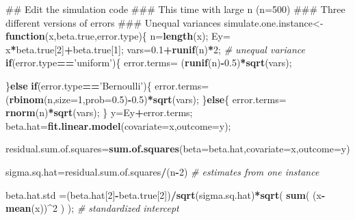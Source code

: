 \documentclass[12pt,]{book}
\newenvironment{Shaded}{\begin{snugshade}}{\end{snugshade}}
\newcommand{\KeywordTok}[1]{\textcolor[rgb]{0.13,0.29,0.53}{\textbf{#1}}}
\newcommand{\DataTypeTok}[1]{\textcolor[rgb]{0.13,0.29,0.53}{#1}}
\newcommand{\DecValTok}[1]{\textcolor[rgb]{0.00,0.00,0.81}{#1}}
\newcommand{\FloatTok}[1]{\textcolor[rgb]{0.00,0.00,0.81}{#1}}
\newcommand{\StringTok}[1]{\textcolor[rgb]{0.31,0.60,0.02}{#1}}
\newcommand{\CommentTok}[1]{\textcolor[rgb]{0.56,0.35,0.01}{\textit{#1}}}
\newcommand{\ControlFlowTok}[1]{\textcolor[rgb]{0.13,0.29,0.53}{\textbf{#1}}}
\newcommand{\OperatorTok}[1]{\textcolor[rgb]{0.81,0.36,0.00}{\textbf{#1}}}
\newcommand{\NormalTok}[1]{#1}
\begin{document}
\begin{Shaded}
\begin{Highlighting}[]
\NormalTok{## Edit the simulation code }
\NormalTok{### This time with large n (n=500)}
\NormalTok{### Three different versions of errors}
\NormalTok{### Unequal variances  }
\NormalTok{simulate.one.instance<-}\ControlFlowTok{function}\NormalTok{(x,beta.true,error.type)\{}
\NormalTok{  n=}\KeywordTok{length}\NormalTok{(x);}
\NormalTok{  Ey=}\StringTok{ }\NormalTok{x}\OperatorTok{*}\NormalTok{beta.true[}\DecValTok{2}\NormalTok{]}\OperatorTok{+}\NormalTok{beta.true[}\DecValTok{1}\NormalTok{];}
\NormalTok{  vars=}\FloatTok{0.1}\OperatorTok{+}\KeywordTok{runif}\NormalTok{(n)}\OperatorTok{*}\DecValTok{2}\NormalTok{; }\CommentTok{# unequal variance }
  \ControlFlowTok{if}\NormalTok{(error.type}\OperatorTok{==}\StringTok{'uniform'}\NormalTok{)\{}
\NormalTok{    error.terms=}\StringTok{ }\NormalTok{(}\KeywordTok{runif}\NormalTok{(n)}\OperatorTok{-}\FloatTok{0.5}\NormalTok{)}\OperatorTok{*}\KeywordTok{sqrt}\NormalTok{(vars);}
    
\NormalTok{  \}}\ControlFlowTok{else} \ControlFlowTok{if}\NormalTok{(error.type}\OperatorTok{==}\StringTok{'Bernoulli'}\NormalTok{)\{}
\NormalTok{    error.terms=(}\KeywordTok{rbinom}\NormalTok{(n,}\DataTypeTok{size=}\DecValTok{1}\NormalTok{,}\DataTypeTok{prob=}\FloatTok{0.5}\NormalTok{)}\OperatorTok{-}\FloatTok{0.5}\NormalTok{)}\OperatorTok{*}\KeywordTok{sqrt}\NormalTok{(vars);}
\NormalTok{  \}}\ControlFlowTok{else}\NormalTok{\{}
\NormalTok{    error.terms=}\StringTok{ }\KeywordTok{rnorm}\NormalTok{(n)}\OperatorTok{*}\KeywordTok{sqrt}\NormalTok{(vars);}
\NormalTok{  \}}
\NormalTok{  y=Ey}\OperatorTok{+}\NormalTok{error.terms;}
\NormalTok{  beta.hat=}\KeywordTok{fit.linear.model}\NormalTok{(}\DataTypeTok{covariate=}\NormalTok{x,}\DataTypeTok{outcome=}\NormalTok{y);}
  
\NormalTok{  residual.sum.of.squares=}\KeywordTok{sum.of.squares}\NormalTok{(}\DataTypeTok{beta=}\NormalTok{beta.hat,}\DataTypeTok{covariate=}\NormalTok{x,}\DataTypeTok{outcome=}\NormalTok{y)}

\NormalTok{sigma.sq.hat=residual.sum.of.squares}\OperatorTok{/}\NormalTok{(n}\OperatorTok{-}\DecValTok{2}\NormalTok{) }\CommentTok{# estimates from one instance}

\NormalTok{  beta.hat.std =(beta.hat[}\DecValTok{2}\NormalTok{]}\OperatorTok{-}\NormalTok{beta.true[}\DecValTok{2}\NormalTok{])}\OperatorTok{/}\KeywordTok{sqrt}\NormalTok{(sigma.sq.hat)}\OperatorTok{*}\KeywordTok{sqrt}\NormalTok{( }\KeywordTok{sum}\NormalTok{( (x}\OperatorTok{-}\KeywordTok{mean}\NormalTok{(x))}\OperatorTok{^}\DecValTok{2}\NormalTok{ ) );  }\CommentTok{# standardized intercept}
  

\end{Highlighting}
\end{Shaded}
\end{document}
